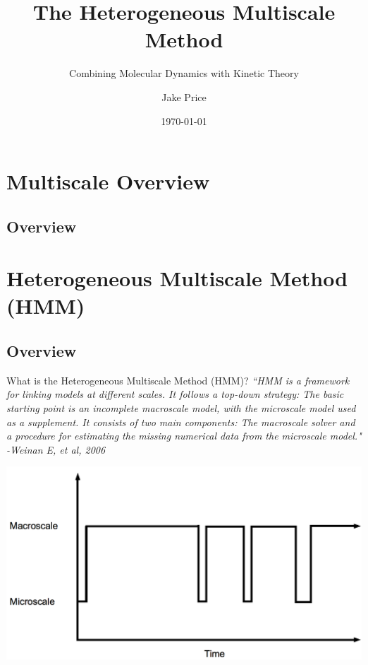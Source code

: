 \documentclass{beamer}
\title{The Heterogeneous Multiscale Method}
\subtitle{Combining Molecular Dynamics with Kinetic Theory}
\author[Price and Shohet]{Jake Price}
\institute[CPSSW]{Computational Physics Student Summer Workshop}
\date{\today}
\begin{document}
	\begin{frame}
		\titlepage
	\end{frame}
	
	
	
	\section{Multiscale Overview}
	\subsection{Overview}
	
	
	
	
	\section{Heterogeneous Multiscale Method (HMM)}
	\subsection{Overview}
	\begin{frame}{What is the Heterogeneous Multiscale Method (HMM)?}
		\vspace{1em}
		\em``HMM is a framework for linking models at different scales. It follows a top-down strategy: The basic starting point is an incomplete macroscale model, with the microscale model used as a supplement. It consists of two main components: The macroscale solver and a procedure for estimating the missing numerical data from the microscale model."\hfill\\\hfill\normalfont -Weinan E, et al, 2006
		\vspace{-1em}
		\begin{center}
			\includegraphics[height = 0.5\textheight]{scheme.png}
			\end{center}
	\end{frame}
	
\end{document}
